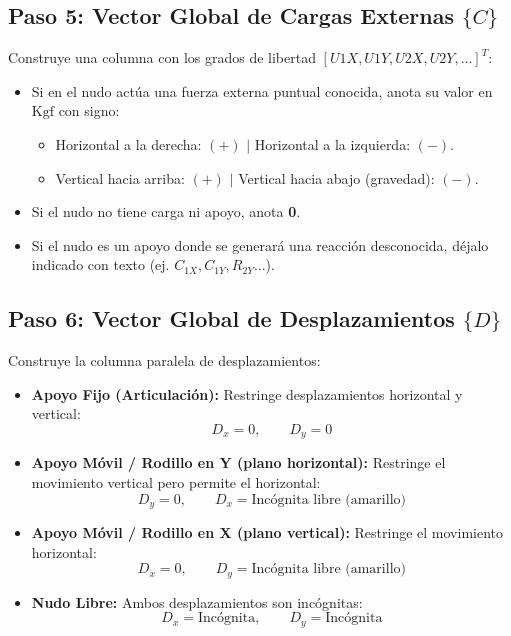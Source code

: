 \documentclass[10pt,a4paper]{article}
\begin{document}
\subsection{Paso 5: Vector Global de Cargas Externas $\{C\}$}
Construye una columna con los grados de libertad $[U1X, U1Y, U2X, U2Y, \dots]^T$:
\begin{itemize}
    \item Si en el nudo actúa una fuerza externa puntual conocida, anota su valor en $\text{Kgf}$ con signo:
    \begin{itemize}
        \item Horizontal a la derecha: $(+)$ $\mid$ Horizontal a la izquierda: $(-)$.
        \item Vertical hacia arriba: $(+)$ $\mid$ Vertical hacia abajo (gravedad): $(-)$.
    \end{itemize}
    \item Si el nudo no tiene carga ni apoyo, anota \textbf{0}.
    \item Si el nudo es un apoyo donde se generará una reacción desconocida, déjalo indicado con texto (ej. $C_{1X}, C_{1Y}, R_{2Y}\dots$).
\end{itemize}

\subsection{Paso 6: Vector Global de Desplazamientos $\{D\}$}
Construye la columna paralela de desplazamientos:
\begin{itemize}
    \item \textbf{Apoyo Fijo (Articulación):} Restringe desplazamientos horizontal y vertical:
    \[
    D_{x} = 0, \qquad D_{y} = 0
    \]
    \item \textbf{Apoyo Móvil / Rodillo en Y (plano horizontal):} Restringe el movimiento vertical pero permite el horizontal:
    \[
    D_{y} = 0, \qquad D_{x} = \text{Incógnita libre (amarillo)}
    \]
    \item \textbf{Apoyo Móvil / Rodillo en X (plano vertical):} Restringe el movimiento horizontal:
    \[
    D_{x} = 0, \qquad D_{y} = \text{Incógnita libre (amarillo)}
    \]
    \item \textbf{Nudo Libre:} Ambos desplazamientos son incógnitas:
    \[
    D_{x} = \text{Incógnita}, \qquad D_{y} = \text{Incógnita}
    \]
\end{itemize}
\end{document}

